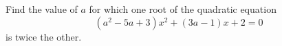 Find the value of $a$ for which one root of the quadratic equation
\[
\left(a^2-5a+3\right)x^2+(3a-1)x+2=0
\]
is twice the other.
